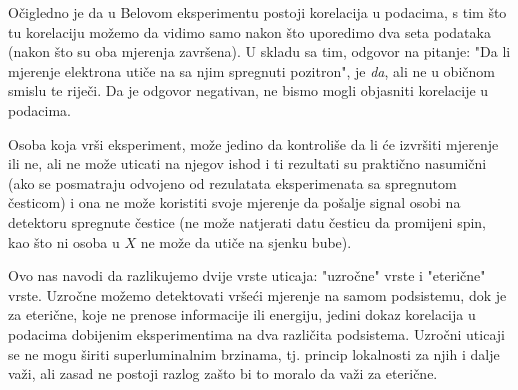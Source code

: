 O\v cigledno je da u Belovom eksperimentu postoji korelacija u podacima, s tim \v sto tu korelaciju mo\v zemo da vidimo
samo nakon \v sto uporedimo dva seta podataka (nakon \v sto su oba mjerenja zavr\v sena).
U skladu sa tim, odgovor na pitanje: "Da li mjerenje elektrona uti\v ce na sa njim spregnuti pozitron", je {\it{da}}, ali ne u obi\v cnom smislu te rije\v ci.
Da je odgovor negativan, ne bismo mogli objasniti korelacije u podacima.

Osoba koja vr\v si eksperiment, mo\v ze jedino da kontroli\v se da li \' ce izvr\v siti mjerenje ili ne, ali ne mo\v ze uticati na njegov ishod i ti rezultati su prakti\v cno
nasumi\v cni (ako se posmatraju odvojeno od rezulatata eksperimenata sa spregnutom \v cesticom) i ona ne mo\v ze koristiti svoje mjerenje da po\v salje signal osobi
na detektoru spregnute \v cestice (ne mo\v ze natjerati datu \v cesticu da promijeni spin, kao \v sto ni osoba u $X$ ne mo\v ze da uti\v ce na sjenku bube).

Ovo nas navodi da razlikujemo dvije vrste uticaja: "uzro\v cne" vrste i "eteri\v cne" vrste.
Uzro\v cne mo\v zemo detektovati vr\v se\' ci mjerenje na samom podsistemu, dok je za eteri\v cne, koje ne prenose informacije ili energiju, jedini dokaz
korelacija u podacima dobijenim eksperimentima na dva razli\v cita podsistema.
Uzro\v cni uticaji se ne mogu \v siriti superluminalnim brzinama, tj. princip lokalnosti za njih i dalje važi, ali zasad ne postoji razlog za\v sto bi to moralo da va\v zi za eteri\v cne.
